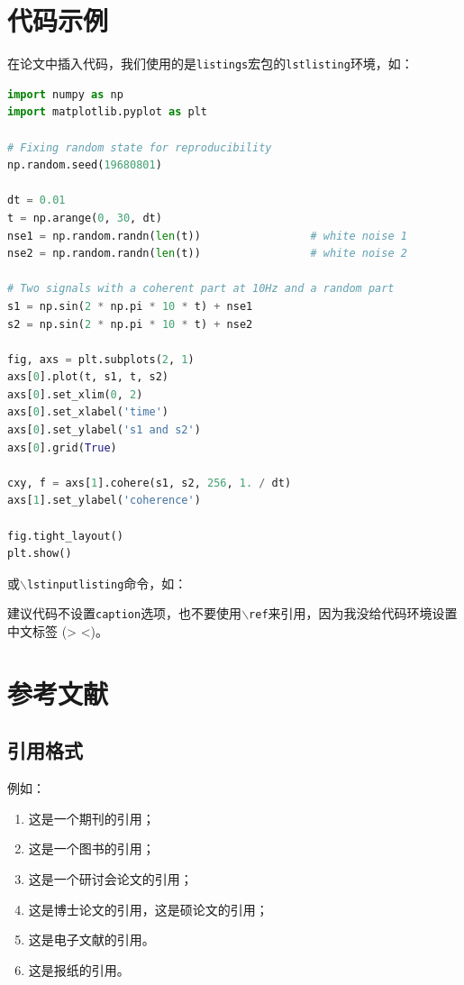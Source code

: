 \section{代码示例}

在论文中插入代码，我们使用的是\texttt{listings}宏包的\texttt{lstlisting}环境，如：
\begin{lstlisting}[language=python]
import numpy as np
import matplotlib.pyplot as plt

# Fixing random state for reproducibility
np.random.seed(19680801)

dt = 0.01
t = np.arange(0, 30, dt)
nse1 = np.random.randn(len(t))                 # white noise 1
nse2 = np.random.randn(len(t))                 # white noise 2
    
# Two signals with a coherent part at 10Hz and a random part
s1 = np.sin(2 * np.pi * 10 * t) + nse1
s2 = np.sin(2 * np.pi * 10 * t) + nse2

fig, axs = plt.subplots(2, 1)
axs[0].plot(t, s1, t, s2)
axs[0].set_xlim(0, 2)
axs[0].set_xlabel('time')
axs[0].set_ylabel('s1 and s2')
axs[0].grid(True)
 
cxy, f = axs[1].cohere(s1, s2, 256, 1. / dt)
axs[1].set_ylabel('coherence')

fig.tight_layout()
plt.show()
\end{lstlisting}
或\texttt{$\backslash$lstinputlisting}命令，如：

建议代码不设置\texttt{caption}选项，也不要使用\texttt{$\backslash$ref}来引用，因为我没给代码环境设置中文标签 (> <)。

\section{参考文献}\label{sec:bibstyle}

\subsection{引用格式}

例如：
\begin{enumerate}
    \item 这是一个期刊的引用\cite{LIGOScientific:2017zic}；
    \item 这是一个图书的引用\cite{Rubakov:2017xzr,Zhang:2021}；
    \item 这是一个研讨会论文的引用\cite{Tanikawa:2021+x}；
    \item 这是博士论文的引用\cite{Migenda:2019xbm,HuangGuoYuan:2020}，这是硕论文的引用\cite{Shojaeifar:2015csv,SongRen:2020}；
    \item 这是电子文献的引用\cite{Piro:2021oaa,bilibili:read}。
    \item 这是报纸的引用\cite{Li:2005}。
\end{enumerate}


